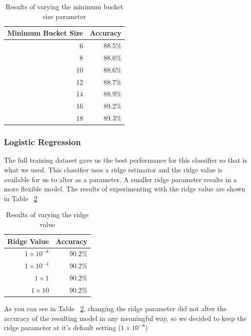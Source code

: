 \documentclass[a4paper,11pt]{article}
\begin{document}
\begin{table}[H]
  \begin{center}
    \begin{tabular}{r | r }
      Minimum Bucket Size & Accuracy  \\ \hline
      6 & 88.5\% \\
      8 & 88.6\% \\
      10 & 88.6\% \\
      12 & 88.7\% \\
      14 & 88.9\% \\
      16 & 89.2\% \\
      18 & 89.3\% \\
    \end{tabular}
  \end{center}
  \caption{Results of varying the minimum bucket size parameter}
  \label{tab:OneRParams}
\end{table}


\subsubsection{Logistic Regression}

The full training dataset gave us the best performance for this classifier so that is what we used.  This classifier uses
a ridge estimator and the ridge value is available for us to alter as a parameter. A smaller ridge parameter results
in a more flexible model. The results of experimenting with the ridge value are shown in Table ~\ref{tab:LogisticParams}

\begin{table}[H]
  \begin{center}
    \begin{tabular}{r | r }
      Ridge Value & Accuracy  \\ \hline
      $ 1 \times 10^{-8} $ & 90.2\% \\
      $ 1 \times 10^{-4} $ & 90.2\% \\
      $ 1 \times 1 $ & 90.2\% \\
      $ 1 \times 10 $ & 90.2\% \\
    \end{tabular}
  \end{center}
  \caption{Results of varying the ridge value}
  \label{tab:LogisticParams}
\end{table}

As you can see in Table ~\ref{tab:LogisticParams}, changing the ridge parameter did not alter the accuracy of the resulting
model in any meaningful way, so we decided to keep the ridge parameter at it's default setting ($ 1 \times 10^{-8} $)
\end{document}
